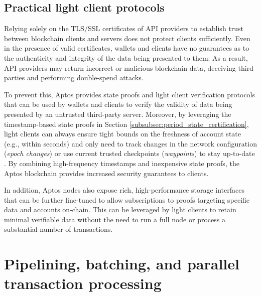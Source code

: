 \documentclass{article}
\begin{document}
\subsection{Practical light client protocols}
Relying solely on the TLS/SSL certificates of API providers to establish trust between blockchain clients and servers does not protect clients sufficiently. Even in the presence of valid certificates, wallets and clients have no guarantees as to the authenticity and integrity of the data being presented to them. As a result, API providers may return incorrect or malicious blockchain data, deceiving third parties and performing double-spend attacks.

To prevent this, Aptos provides state proofs and light client verification protocols that can be used by wallets and clients to verify the validity of data being presented by an untrusted third-party server. Moreover, by leveraging the timestamp-based state proofs in Section \ref{subsubsec:period_state_certification}, light clients can always ensure tight bounds on the freshness of account state (e.g., within seconds) and only need to track changes in the network configuration (\emph{epoch changes}) or use current trusted checkpoints (\emph{waypoints}) to stay up-to-date \cite{waypoints}. By combining high-frequency timestamps and inexpensive state proofs, the Aptos blockchain provides increased security guarantees to clients. 

In addition, Aptos nodes also expose rich, high-performance storage interfaces that can be further fine-tuned to allow subscriptions to proofs targeting specific data and accounts on-chain. This can be leveraged by light clients to retain minimal verifiable data without the need to run a full node or process a substantial number of transactions.

\section{Pipelining, batching, and parallel transaction processing}
\label{sec:pipelining_batching}
\end{document}
